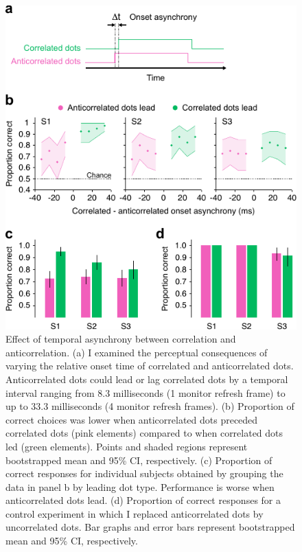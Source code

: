 \begin{figure}
  \centering
  \includegraphics{Fig6}
  \caption[Effect of temporal asynchrony between correlation and anticorrelation.]{Effect of temporal asynchrony between correlation and anticorrelation. (a) I examined the perceptual consequences of varying the relative onset time of correlated and anticorrelated dots. Anticorrelated dots could lead or lag correlated dots by a temporal interval ranging from 8.3 milliseconds (1 monitor refresh frame) to up to 33.3 milliseconds (4 monitor refresh frames). (b) Proportion of correct choices was lower when anticorrelated dots preceded correlated dots (pink elements) compared to when correlated dots led (green elements). Points and shaded regions represent bootstrapped mean and 95\% CI, respectively. (c) Proportion of correct responses for individual subjects obtained by grouping the data in panel b by leading dot type. Performance is worse when anticorrelated dots lead. (d) Proportion of correct responses for a control experiment in which I replaced anticorrelated dots by uncorrelated dots. Bar graphs and error bars represent bootstrapped mean and 95\% CI, respectively.}
  \label{fig:c2f6}
\end{figure}



